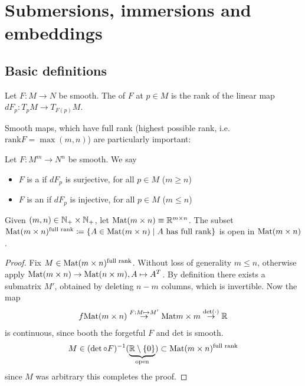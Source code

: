\chapter{Submersions, immersions and embeddings}

\section{Basic definitions}

\begin{definition*}
    Let \(F:M\to N\) be smooth. The  of \(F\) at \(p\in M\)
    is the rank of the linear map \(dF_p:T_p M \to T_{F(p)}M\).
\end{definition*}

Smooth maps, which have full rank (highest possible rank, i.e. \(\text{rank} F=\max(m,n)\)) are particularly important:
\begin{definition*}
    Let \(F:M^m\to N^n\) be smooth. 
    We say \begin{itemize}
        \item \(F\) is a  if \(dF_p\) is surjective, for all \(p\in M\) (\(m\geq n\))
        \item \(F\) is an  if \(dF_p\) is injective, for all \(p\in M\) (\(m\leq n\))
    \end{itemize}
\end{definition*}

\begin{lemma}\label{lem:4.1}
    Given \((m,n)\in \mathbb{N}_+\times \mathbb{N}_+\), let \({\text{Mat}}(m\times n)\equiv \mathbb{R}^{m\times n}\).
    The subset \({\text{Mat}}(m\times n)^{\text{full rank}}\coloneqq \{A\in {\text{Mat}}(m\times n)\mid A\text{ has full rank}\}\)
    is open in \({\text{Mat}}(m\times n)\).
\end{lemma}

\begin{proof}
    Fix \(M\in{\text{Mat}}(m\times n)^{\text{full rank}}\). Without loss of generality \(m\leq n\), otherwise 
    apply \({\text{Mat}}(m\times n)\to {\text{Mat}}(n\times m),A\mapsto A^T\). By definition 
    there exists a submatrix \(M'\), obtained by deleting \(n-m\) columns, which is invertible.
    Now the map 
    \begin{align*}
        f{\text{Mat}}(m\times n)\stackrel{F:M\mapsto M'}{\to} {\text{Mat}} m\times m\stackrel{\text{det}(\cdot)}{\to} \mathbb{R}
    \end{align*}
    is continuous, since booth the forgetful \(F\) and det is smooth.
     \[M\in (\det\circ F)^{-1}(\underbrace{\mathbb{R}\setminus\{0\}}_{\text{open}})\subset {\text{Mat}}(m\times n)^{\text{full rank}}\]
    since \(M\) was arbitrary this completes the proof.
\end{proof}

